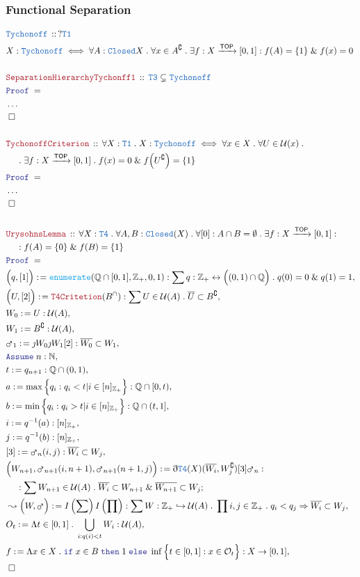 \documentclass[12pt]{scrartcl}
\newcommand{\TYPE}[1]{\textcolor{NavyBlue}{\mathtt{#1}}}
\newcommand{\FUNC}[1]{\textcolor{Cerulean}{\mathtt{#1}}}
\newcommand{\LOGIC}[1]{\textcolor{Blue}{\mathtt{#1}}}
\newcommand{\THM}[1]{\textcolor{Maroon}{\mathtt{#1}}}
\renewcommand{\.}{\; . \;}
\newcommand{\de}{: \kern 0.1pc =}
\newcommand{\If}{\LOGIC{if} \;}
\newcommand{\Then}{ \; \LOGIC{then} \;}
\newcommand{\Else}{\; \LOGIC{else} \;}
\newcommand{\Act}[1]{\left( #1 \right)}
\newcommand{\Theorem}[2]{& \THM{#1} \, :: \, #2 \\ & \Proof = \\ }
\newcommand{\DeclareType}[2]{& \TYPE{#1} \, :: \, #2 \\}
\newcommand{\DefineType}[3]{& #1 : \TYPE{#2} \iff #3 \\}
\newcommand{\NewLine}{\\ & \kern 1pc}
\newcommand{\Page}[1]{ \begin{align*} #1 \end{align*}   }
\newcommand{ \bd }{ \ByDef }
\newcommand{\NoProof}{ & \ldots \\ \EndProof}
\renewcommand{\And}{\; \& \;}
\newcommand{\Imply}{\Rightarrow}
\newcommand{\Int}{\mathbb{Z} }
\newcommand{\Rats}{\mathbb{Q} }
\newcommand{\Nat}{\mathbb{N} }
\newcommand{\ToInj}{\hookrightarrow}
\newcommand{\ToBij}{\leftrightarrow}
\newcommand{\Arrow}{\xrightarrow}
\renewcommand{\c}{\complement}
\newcommand{\Say}[3]{& #1 \de #2 : #3, \\}
\newcommand{\Conclude}[3]{& #1 \de #2 : #3; \\}
\newcommand{\Derive}[3]{& \leadsto #1 \de #2 : #3, \\}
\newcommand{\Assume}[2]{& \LOGIC{Assume} \; #1 : #2, \\}
\newcommand{\QED}{\; \square}
\newcommand{\EndProof}{& \QED \\}
\newcommand{\ByDef}{\eth}
\newcommand{\ByConstr}{\jmath}
\newcommand{\Proof}{\LOGIC{Proof} \; }
\newcommand{\TOP}{\mathsf{TOP}}
\renewcommand{\U}{\mathcal{U}}
\renewcommand{\O}{\mathcal{O}}
\begin{document}
\subsubsection{Functional Separation}
\Page{
	\DeclareType{Tychonoff}{?\TYPE{T1}}   
	\DefineType{X}{Tychonoff}{ 
		\forall A : \TYPE{Closed}{X} \.   
		\forall x \in A^\c \.
		\exists f : X \Arrow{\TOP} [0,1] :
		f(A) = \{1\} \And f(x) = 0
	}
	\\
	\Theorem{SeparationHierarchyTychonff1}
	{
		\TYPE{T3} \subsetneq \TYPE{Tychonoff}
	}
	\NoProof
	\\
	\Theorem{TychonoffCriterion}
	{
		\forall X : \TYPE{T1} \.
		X : \TYPE{Tychonoff} 
		\iff
		\forall x \in X \.
		\forall U \in \U(x) \. \NewLine \.  
		\exists f : X \Arrow{\TOP} [0,1] \.
		f(x) = 0 \And f\Big(U^\c\Big) = \{1\}
	}
	\NoProof
	\\
	\Theorem{UrysohnsLemma}
	{
		\forall X : \TYPE{T4} \.
		\forall A,B : \TYPE{Closed}(X) \. 
		\forall [0] : A \cap B = \emptyset \.
		\exists f : X \Arrow{\TOP} [0,1] : \NewLine : 
		f(A) = \{0\} \And f(B) = \{1\}
	}
	\Say{\Big(q,[1]\Big)}{\FUNC{enumerate}(\Rats \cap [0,1], \Int_+, 0,1)}
	{
		\sum  q : \Int_+ \ToBij \Big( (0, 1) \cap \Rats \Big) \. q(0) = 0 \And q(1) = 1 
	}
	\Say{\Big( U,  [2] \Big)}{ \THM{T4Critetion}(B^\cap) }
	{
		\sum U \in \U(A) \. 
		\overline{U} \subset B^\c
	}
	\Say{W_0}{U}{\U(A)}
	\Say{W_1}{B^\c}{\U(A)}
	\Say{\mars_1}{\ByConstr W_0 \ByConstr W_1[2]}{ \overline{W_0} \subset W_1}
	\Assume{n}{\Nat}
	\Say{t}{q_{n+1}}{\Rats \cap (0,1)}
	\Say{a}{ \max \Big\{ q_i :  q_i < t | i \in [n]_{\Int_+}  \Big\} }{\Rats \cap [0,t)} 
	\Say{b}{ \min \Big\{ q_i :  q_i > t | i \in [n]_{\Int_+}  \Big\} }{\Rats \cap (t,1]}
	\Say{i}{q^{-1}(a)}{[n]_{\Int_+}} 
	\Say{j}{q^{-1}(b)}{[n]_{\Int_+}}
	\Say{[3]}{\mars_n(i,j)}{\overline{W_i} \subset W_j}
	\Conclude{ \Big(W_{n+1}, \mars_{n+1}(i,n+1),\mars_{n+1}(n+1,j)  \Big) }
	{ \bd \TYPE{T4}(X)(\overline{W_i}, W_j^\c) [3] \mars_n   }
	{    
		\NewLine : 
		\sum W_{n+1} \in \U(A) \.   \overline{ W_i} \subset W_{n+1} \And \overline{W_{n+1}} \subset W_j
	}  
	\Derive{\Big( W, \mars \Big) }{I\Act{\sum}I\Act{\prod}}
	{
		\sum  W : \Int_+ \ToInj \U(A) \. \prod  i,j \in \Int_+ \. q_i < q_j \Imply \overline{W_i} \subset W_j
	}
	\Say{O_t}{\Lambda t \in [0,1] \. \bigcup_{i : q(i) < t} W_i}{\U(A)}
	\Say{f}{\Lambda x \in X \. \If x \in B \Then 1 \Else \inf 
		\Big\{  t \in [0,1] :  x \in \O_t   \Big\}}{X \to [0,1]}            
	\EndProof
}
\end{document}
